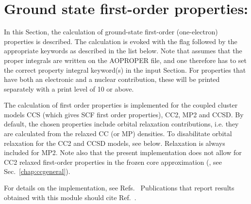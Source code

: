 \section{Ground state first-order properties: }
\label{sec:ccfop}

In this Section, the calculation of ground-state first-order
(one-electron) properties is described. The calculation
is evoked with the  flag followed by the appropriate
keywords as described in the list below. Note that 
assumes that the proper integrals are written on the
AOPROPER file, and one therefore has to set the correct property
integral keyword(s) in the  input Section. For properties
that have both an electronic and a nuclear contribution, these will
be printed separately with a print level of 10 or above.

The calculation of first order properties is implemented for the 
coupled cluster models CCS (which gives SCF first order properties),
CC2, MP2 and CCSD.  
By default, the chosen properties include orbital relaxation contributions,
i.e. they are calculated from the relaxed CC (or MP) densities. 
To disabilitate orbital relaxation for the CC2 and CCSD models, 
see  below. Relaxation is always included for MP2. 
Note also that the present implementation does not allow for CC2 relaxed first-order
properties in the frozen core approximation (, see Sec.~\ref{chap:ccgeneral}).

For details on the implementation, see 
Refs.~\cite{Halkier:CCFOP,HalCor:CC2FOP}
Publications that report results obtained with this module
should cite Ref.\ \cite{Halkier:CCFOP}.


